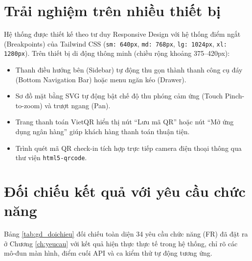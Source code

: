 
\section{Trải nghiệm trên nhiều thiết bị}
\label{sec:gd_thietbi}

Hệ thống được thiết kế theo tư duy Responsive Design với hệ thống điểm ngắt (Breakpoints) của Tailwind CSS (\texttt{sm: 640px}, \texttt{md: 768px}, \texttt{lg: 1024px}, \texttt{xl: 1280px}). Trên thiết bị di động thông minh (chiều rộng khoảng 375--420px):
\begin{itemize}
    \item Thanh điều hướng bên (Sidebar) tự động thu gọn thành thanh công cụ đáy (Bottom Navigation Bar) hoặc menu ngăn kéo (Drawer).
    \item Sơ đồ mặt bằng SVG tự động bật chế độ thu phóng cảm ứng (Touch Pinch-to-zoom) và trượt ngang (Pan).
    \item Trang thanh toán VietQR hiển thị nút ``Lưu mã QR'' hoặc nút ``Mở ứng dụng ngân hàng'' giúp khách hàng thanh toán thuận tiện.
    \item Trình quét mã QR check-in tích hợp trực tiếp camera điện thoại thông qua thư viện \texttt{html5-qrcode}.
\end{itemize}


\section{Đối chiếu kết quả với yêu cầu chức năng}
\label{sec:gd_doichieu}

Bảng \ref{tab:gd_doichieu} đối chiếu toàn diện 34 yêu cầu chức năng (FR) đã đặt ra ở Chương \ref{ch:yeucau} với kết quả hiện thực thực tế trong hệ thống, chỉ rõ các mô-đun màn hình, điểm cuối API và ca kiểm thử tự động tương ứng.


